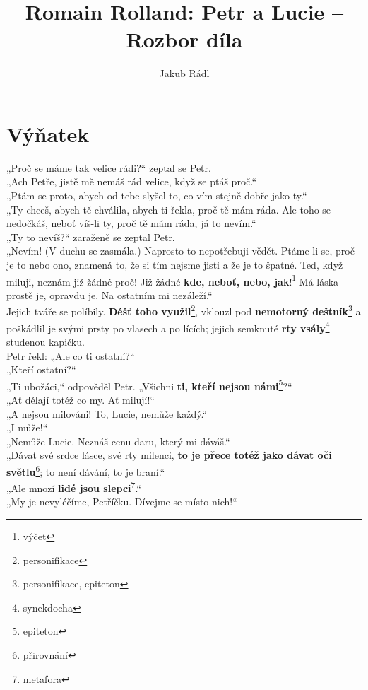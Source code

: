 \documentclass[10pt,a4paper]{article}
\date{}
\author{Jakub Rádl}
\title{Romain Rolland: Petr a Lucie -- Rozbor díla}
\begin{document}
\maketitle

\section*{Výňatek}
„Proč se máme tak velice rádi?“ zeptal se Petr.\\
„Ach Petře, jistě mě nemáš rád velice, když se ptáš proč.“\\
„Ptám se proto, abych od tebe slyšel to, co vím stejně dobře jako ty.“\\
„Ty chceš, abych tě chválila, abych ti řekla, proč tě mám ráda. Ale toho se nedočkáš, neboť víš-li ty, proč tě mám ráda, já to nevím.“\\
„Ty to nevíš?“ zaraženě se zeptal Petr.\\
„Nevím! (V duchu se zasmála.) Naprosto to nepotřebuji vědět. Ptáme-li se, proč je to nebo ono, znamená to, že si tím nejsme jisti a že je to špatné. Teď, když miluji, neznám již žádné proč! Již žádné \textbf{kde, neboť, nebo, jak}!\footnote{výčet} Má láska prostě je, opravdu je. Na ostatním mi nezáleží.“\\
Jejich tváře se políbily. \textbf{Déšť toho využil}\footnote{personifikace}, vklouzl pod \textbf{nemotorný deštník}\footnote{personifikace, epiteton} a poškádlil je svými prsty po vlasech a po lících; jejich semknuté \textbf{rty vsály}\footnote{synekdocha} studenou kapičku.\\
Petr řekl: „Ale co ti ostatní?“\\
„Kteří ostatní?“\\
„Ti ubožáci,“ odpověděl Petr. „Všichni \textbf{ti, kteří nejsou námi}\footnote{epiteton}?“\\
„Ať dělají totéž co my. Ať milují!“\\
„A nejsou milováni! To, Lucie, nemůže každý.“\\
„I může!“\\
„Nemůže Lucie. Neznáš cenu daru, který mi dáváš.“\\
„Dávat své srdce lásce, své rty milenci, \textbf{to je přece totéž jako dávat oči světlu}\footnote{přirovnání}; to není dávání, to je braní.“\\
„Ale mnozí \textbf{lidé jsou slepci}\footnote{metafora}.“\\
„My je nevyléčíme, Petříčku. Dívejme se místo nich!“\\
\end{document}
